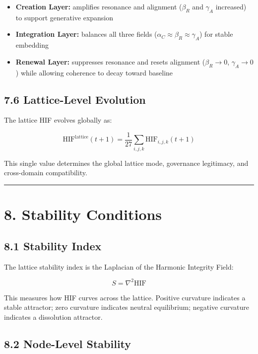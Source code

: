 \begin{itemize}
\tightlist
\item
  \textbf{Creation Layer:} amplifies resonance and alignment (\(\beta_R\) and \(\gamma_A\) increased) to support generative expansion
\item
  \textbf{Integration Layer:} balances all three fields (\(\alpha_C \approx \beta_R
  \approx \gamma_A\)) for stable embedding
\item
  \textbf{Renewal Layer:} suppresses resonance and resets alignment (\(\beta_R
  \rightarrow 0\), \(\gamma_A \rightarrow 0\)) while allowing coherence to decay toward baseline
\end{itemize}

\subsection{7.6 Lattice-Level Evolution}\label{lattice-level-evolution}

The lattice HIF evolves globally as:

\[
\mathrm{HIF}^{\text{lattice}}(t+1) = \frac{1}{27} \sum_{i,j,k}
\mathrm{HIF}_{i,j,k}(t+1)
\]

This single value determines the global lattice mode, governance legitimacy, and cross-domain compatibility.

\begin{center}\rule{0.5\linewidth}{0.5pt}\end{center}

\section{8. Stability Conditions}\label{stability-conditions}

\subsection{8.1 Stability Index}\label{stability-index}

The lattice stability index is the Laplacian of the Harmonic Integrity Field:

\[
S = \nabla^2 \mathrm{HIF}
\]

This measures how HIF curves across the lattice. Positive curvature indicates a stable attractor; zero curvature indicates neutral equilibrium; negative curvature indicates a dissolution attractor.

\subsection{8.2 Node-Level Stability}\label{node-level-stability}

